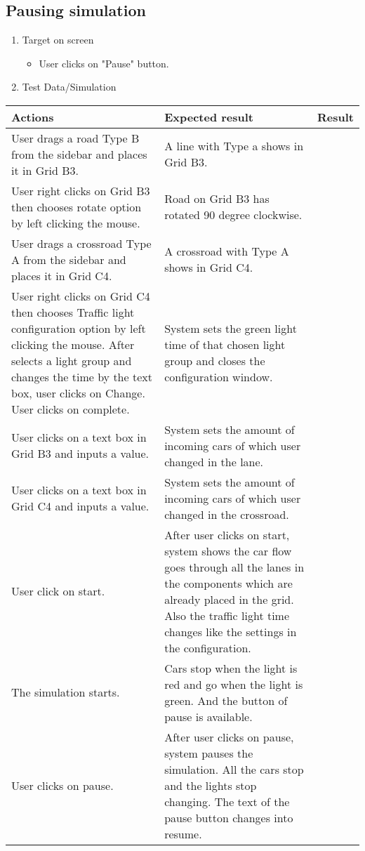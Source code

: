 \newpage

\subsection{Pausing  simulation}

\begin{enumerate}

	\item Target on screen
	\begin{itemize}
		\item User clicks on "Pause" button.
	\end{itemize}
	\item Test Data/Simulation
\end{enumerate}
	\begin{tabularx}{\textwidth}{|X|X|p{2.5cm}|}\hline
		Actions & Expected result & Result \\\hline

		User drags a road Type B from the sidebar and places it in Grid B3. & A line with Type a shows in Grid B3. & \pass \\\hline
		User right clicks on Grid B3 then chooses rotate option by left clicking the mouse. & Road on Grid B3 has rotated 90 degree clockwise. & \pass \\\hline
		User drags a crossroad Type A from the sidebar and places it in Grid C4. & A crossroad with Type A shows in Grid C4. & \pass \\\hline
		User right clicks on Grid C4 then chooses Traffic light configuration  option by left clicking the mouse. After selects a light group and changes the time by the text box, user clicks on Change. User clicks on complete. & System sets the green light time of that chosen light group and closes the configuration window.  & \pass \\\hline
		User clicks on a text box in Grid B3 and inputs a value. & System sets the amount of incoming cars of which user changed in the lane. & \pass \\\hline
		User clicks on a text box in Grid C4 and inputs a value. & System sets the amount of incoming cars of which user changed in the crossroad. & \pass \\\hline
		User click on start. & After user clicks on start, system shows the car flow goes through all the lanes in the components which are already placed in the grid. Also the traffic light time changes like the settings in the configuration. & \pass \\\hline
		The simulation starts. &	Cars stop when the light is red and go when the light is green. And the button of pause is available. & \pass \\\hline	
		User clicks on pause. & After user clicks on pause, system pauses the simulation. All the cars stop and the lights stop changing. The text of the pause button changes into resume. & \pass \\\hline
	\end{tabularx}

